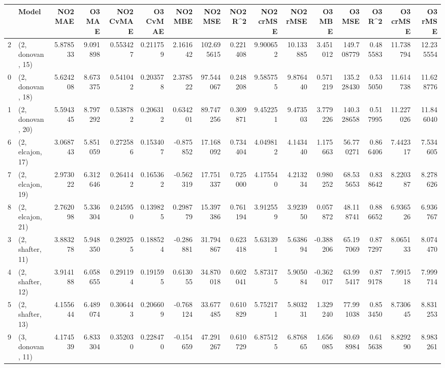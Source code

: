 \begin{tabular}{llrrrrrrrrrrrrrr}
\toprule
{} &             Model &   NO2 MAE &     O3 MAE &  NO2 CvMAE &  O3 CvMAE &   NO2 MBE &     NO2 MSE &   NO2 R\textasciicircum2 &  NO2 crMSE &   NO2 rMSE &    O3 MBE &      O3 MSE &    O3 R\textasciicircum2 &   O3 crMSE &    O3 rMSE \\
\midrule
2  &  (2, donovan, 15) &  5.878533 &   9.091898 &   0.553427 &  0.211759 &  2.161642 &  102.695615 &  0.221408 &   9.900652 &  10.133885 &  3.451012 &  149.708779 &  0.485583 &  11.738794 &  12.235554 \\
0  &  (2, donovan, 18) &  5.624208 &   8.673375 &   0.541042 &  0.203578 &  2.378522 &   97.544067 &  0.248208 &   9.585755 &   9.876440 &  0.571219 &  135.228430 &  0.535050 &  11.614738 &  11.628776 \\
1  &  (2, donovan, 20) &  5.594345 &   8.797292 &   0.538782 &  0.206312 &  0.634201 &   89.747256 &  0.309871 &   9.452251 &   9.473503 &  3.779226 &  140.328658 &  0.517995 &  11.227026 &  11.846040 \\
6  &  (2, elcajon, 17) &  3.068743 &   5.851059 &   0.272586 &  0.153407 & -0.875852 &   17.168092 &  0.734404 &   4.049812 &   4.143440 &  1.175663 &   56.770271 &  0.866406 &   7.442317 &   7.534605 \\
7  &  (2, elcajon, 19) &  2.973022 &   6.312646 &   0.264142 &  0.165362 & -0.562319 &   17.751337 &  0.725000 &   4.175540 &   4.213234 &  0.980252 &   68.535653 &  0.838642 &   8.220387 &   8.278626 \\
8  &  (2, elcajon, 21) &  2.762098 &   5.336304 &   0.245950 &  0.139825 &  0.298779 &   15.397386 &  0.761194 &   3.912559 &   3.923950 &  0.057872 &   48.118741 &  0.886652 &   6.936526 &   6.936767 \\
3  &  (2, shafter, 11) &  3.883278 &   5.948350 &   0.289255 &  0.188524 & -0.286881 &   31.794867 &  0.623418 &   5.631391 &   5.638694 & -0.388206 &   65.197069 &  0.877297 &   8.065133 &   8.074470 \\
4  &  (2, shafter, 12) &  3.914188 &   6.058655 &   0.291194 &  0.191595 &  0.613055 &   34.870018 &  0.602041 &   5.873175 &   5.905084 & -0.362017 &   63.995417 &  0.879178 &   7.991518 &   7.999714 \\
5  &  (2, shafter, 13) &  4.155644 &   6.489074 &   0.306443 &  0.206609 & -0.768124 &   33.677485 &  0.610829 &   5.752171 &   5.803231 &  1.329240 &   77.991038 &  0.853450 &   8.730645 &   8.831253 \\
9  &  (3, donovan, 11) &  4.174539 &   6.833304 &   0.352030 &  0.228470 & -0.154659 &   47.291267 &  0.610729 &   6.875125 &   6.876865 &  1.656085 &   80.698984 &  0.615638 &   8.829290 &   8.983261 \\

\end{tabular}
